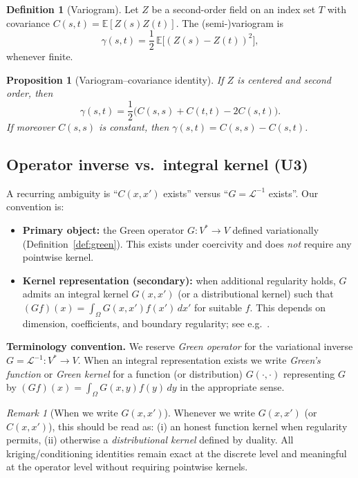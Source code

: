 \documentclass[11pt]{article}
\theoremstyle{definition}
\newtheorem{definition}{Definition}[section]
\theoremstyle{plain}
\newtheorem{proposition}{Proposition}[section]
\theoremstyle{remark}
\newtheorem{remark}{Remark}[section]
\begin{document}
\begin{definition}[Variogram]\label{def:variogram}
Let $Z$ be a second-order field on an index set $T$ with covariance $C(s,t)=\mathbb{E}[Z(s)Z(t)]$.
The (semi-)variogram is
\[
\gamma(s,t)=\frac12\,\mathbb{E}\big[(Z(s)-Z(t))^2\big],
\]
whenever finite.
\end{definition}

\begin{proposition}[Variogram--covariance identity]\label{prop:varcov}
If $Z$ is centered and second order, then
\[
\gamma(s,t)=\frac12\big(C(s,s)+C(t,t)-2C(s,t)\big).
\]
If moreover $C(s,s)$ is constant, then $\gamma(s,t)=C(s,s)-C(s,t)$.
\end{proposition}

\subsection{Operator inverse vs.\ integral kernel (U3)}\label{sec:kernel-vs-operator}

A recurring ambiguity is ``$C(x,x')$ exists'' versus ``$G=\mathcal{L}^{-1}$ exists''. Our convention is:
\begin{itemize}[leftmargin=2em]
\item \textbf{Primary object:} the Green operator $G:V^\ast\to V$ defined variationally (Definition~\ref{def:green}).
This exists under coercivity and does \emph{not} require any pointwise kernel.
\item \textbf{Kernel representation (secondary):} when additional regularity holds, $G$ admits an integral kernel $G(x,x')$
(or a distributional kernel) such that $(Gf)(x)=\int_\Omega G(x,x')f(x')\,dx'$ for suitable $f$.
This depends on dimension, coefficients, and boundary regularity; see e.g.\ \citep{EvansPDE2010,GilbargTrudinger1983}.
\end{itemize}

\noindent\textbf{Terminology convention.}
We reserve \emph{Green operator} for the variational inverse $G=\mathcal{L}^{-1}:V^\ast\to V$.
When an integral representation exists we write \emph{Green's function} or \emph{Green kernel} for a function (or distribution)
$G(\cdot,\cdot)$ representing $G$ by $(Gf)(x)=\int_\Omega G(x,y)f(y)\,dy$ in the appropriate sense.

\begin{remark}[When we write $G(x,x')$]
Whenever we write $G(x,x')$ (or $C(x,x')$), this should be read as:
(i) an honest function kernel when regularity permits,
(ii) otherwise a \emph{distributional kernel} defined by duality.
All kriging/conditioning identities remain exact at the discrete level and meaningful at the operator level without requiring pointwise kernels.
\end{remark}
\end{document}
